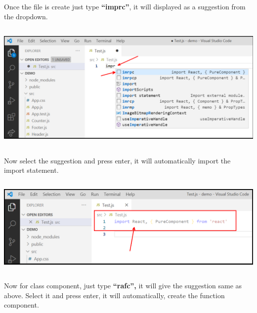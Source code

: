 \documentclass{article}
\begin{document}
\noindent 

\noindent 

\noindent 

\noindent 

\noindent 

\noindent 

\noindent 

\noindent 
\newpage
\noindent Once the file is create just type \textbf{``imprc''}, it will displayed as a suggestion from the dropdown. 

\begin{center}
	\noindent \includegraphics*[width=6.06in, height=2.50in]{IMG-07-05}
\end{center}

\noindent 

\noindent 

\noindent Now select the suggestion and press enter, it will automatically import the import statement.

\begin{center}
	\noindent \includegraphics*[width=6.24in, height=1.89in]{IMG-07-06}
\end{center}

\noindent 

\noindent 

\noindent Now for class component, just type \textbf{``rafc'',} it will give the suggestion same as above. Select it and press enter, it will automatically, create the function component.
\end{document}
